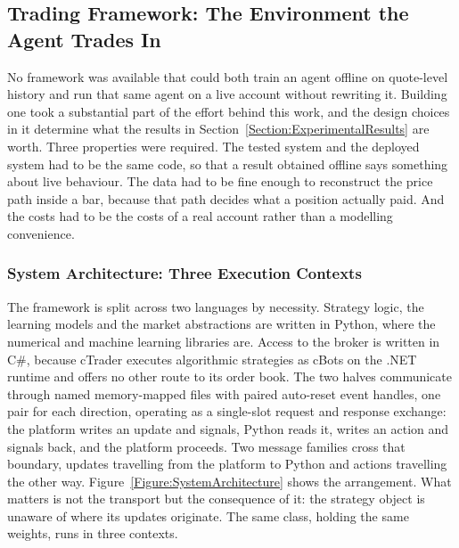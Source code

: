 \subsection{Trading Framework: The Environment the Agent Trades In}
\label{Subsection:TradingFramework}

No framework was available that could both train an agent offline on quote-level history and run that same agent on a live account without rewriting it. Building one took a substantial part of the effort behind this work, and the design choices in it determine what the results in Section~\ref{Section:ExperimentalResults} are worth. Three properties were required. The tested system and the deployed system had to be the same code, so that a result obtained offline says something about live behaviour. The data had to be fine enough to reconstruct the price path inside a bar, because that path decides what a position actually paid. And the costs had to be the costs of a real account rather than a modelling convenience.

\subsubsection{System Architecture: Three Execution Contexts}

The framework is split across two languages by necessity. Strategy logic, the learning models and the market abstractions are written in Python, where the numerical and machine learning libraries are. Access to the broker is written in C\#, because cTrader \cite{noauthor_forex_nodate} executes algorithmic strategies as cBots on the .NET runtime and offers no other route to its order book. The two halves communicate through named memory-mapped files with paired auto-reset event handles, one pair for each direction, operating as a single-slot request and response exchange: the platform writes an update and signals, Python reads it, writes an action and signals back, and the platform proceeds. Two message families cross that boundary, updates travelling from the platform to Python and actions travelling the other way. Figure~\ref{Figure:SystemArchitecture} shows the arrangement. What matters is not the transport but the consequence of it: the strategy object is unaware of where its updates originate. The same class, holding the same weights, runs in three contexts.

